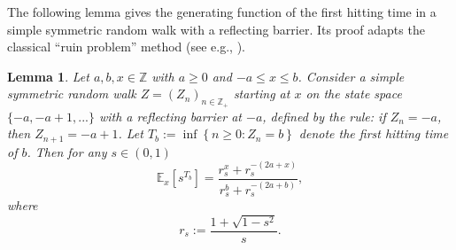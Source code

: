 \documentclass[12pt]{article}
\newtheorem{lem}[thm]{Lemma}
\numberwithin{equation}{section}
\begin{document}
The following lemma gives the generating function of the first hitting time in a simple symmetric random walk with a reflecting barrier. Its proof adapts the classical “ruin problem” method (see e.g., \cite[Chapter XIV.4]{FW}).

\begin{lem}\label{lem-3.2}
Let $a, b, x \in \mathbb{Z}$ with $a \geq 0$ and $-a \leq x\le b$.
Consider a simple symmetric random walk $Z=(Z_{n})_{n \in \mathbb{Z}_{+}}$ starting at $x$
on the state space $\{-a,-a+1,...\}$ with a reflecting barrier at $-a$, defined by the rule: if  $Z_n=-a$, then  $Z_{n+1}=-a+1$.
Let $T_{b}:=\inf \left\{n\ge0: Z_{n}=b \right\} $ denote the first hitting time of $b$. Then for any $s \in (0,1)$
\begin{equation}\label{3.0}
\mathbb{E}_{x}\left[s^{T_{b}}\right]=\frac{r_s^{x}+r_s^{-(2a+x)}}{r_s^{b}+r_s^{-(2a+b)}},
\end{equation}
where
\begin{equation}\label{3.1}
r_s:=\frac{1+\sqrt{1-s^{2}}}{s}.
\end{equation}
\end{lem}
\end{document}
